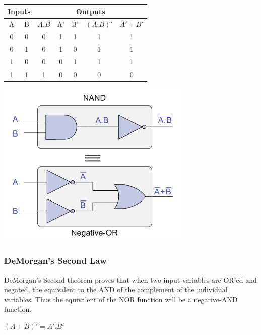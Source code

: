 \documentclass[a4paper, 12pt]{article}
\begin{document}
\begin{center}
  \begin{tabular}{|c|c|c|c|c|c|c|}
    \hline
    \multicolumn{2}{|c|}{Inputs}& \multicolumn{5}{|c|}{Outputs}  \\
    \hline
    A & B & $A.B$ & A' & B' & $(A.B)'$ & $A' + B'$ \\
    \hline
    0 & 0 & 0 & 1 & 1 & 1 & 1\\
    0 & 1 & 0 & 1 & 0 & 1 & 1\\
    1 & 0 & 0 & 0 & 1 & 1 & 1\\
    1 & 1 & 1 & 0 & 0 & 0 & 0\\
    \hline
  \end{tabular}
  \includegraphics{demorgan-first}
\end{center}

\subsubsection{DeMorgan's Second Law}
DeMorgan's Second theorem proves that when two input variables are OR'ed and negated, the equivalent to the AND of the complement of the individual variables. Thus the equivalent of the NOR function will be a negative-AND function.
\begin{center}
  $(A + B)' = A' . B'$
\end{center} 
\end{document}
